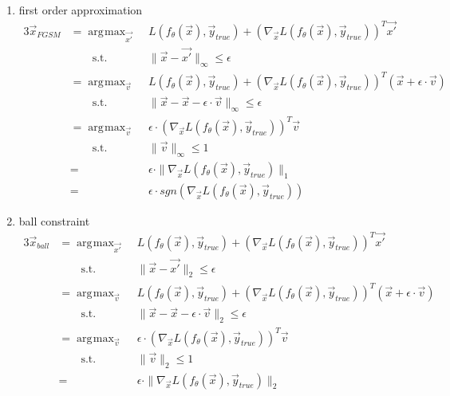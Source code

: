 \documentclass{amsart}
\DeclareMathOperator*{\argmax}{arg\!\max}
\begin{document}
\begin{enumerate}[label=(\alph*)]

\item first order approximation
\begin{alignat*}{3}
    \vec{x}_{FGSM} &= \argmax_{\vec{x'}} & \quad & L(f_{\theta}(\vec{x}), \vec{y}_{true}) + (\nabla_{\vec{x}} L(f_{\theta}(\vec{x}), \vec{y}_{true}))^T \vec{x'} \\
                   & \qquad \textrm{s.t.} & \quad & \| \vec{x} - \vec{x'} \|_{\infty} \le \epsilon \\
                   &= \argmax_{\vec{v}} & \quad & L(f_{\theta}(\vec{x}), \vec{y}_{true}) + (\nabla_{\vec{x}} L(f_{\theta}(\vec{x}), \vec{y}_{true}))^T (\vec{x} + \epsilon \cdot \vec{v}) \\
                   & \qquad \textrm{s.t.} & \quad & \| \vec{x} - \vec{x} - \epsilon \cdot \vec{v} \|_{\infty} \le \epsilon \\
                   &= \argmax_{\vec{v}} & \quad & \epsilon \cdot (\nabla_{\vec{x}} L(f_{\theta}(\vec{x}), \vec{y}_{true}))^T \vec{v} \\
                   & \qquad \textrm{s.t.} & \quad & \| \vec{v} \|_{\infty} \le 1 \\ 
                   &= & & \epsilon \cdot \| \nabla_{\vec{x}} L(f_{\theta}(\vec{x}), \vec{y}_{true}) \|_{1} \\
                   &= & & \epsilon \cdot  sgn(\nabla_{\vec{x}} L(f_{\theta}(\vec{x}), \vec{y}_{true}))
\end{alignat*}

\item ball constraint
\begin{alignat*}{3}
    \vec{x}_{ball} &= \argmax_{\vec{x'}} & \quad & L(f_{\theta}(\vec{x}), \vec{y}_{true}) + (\nabla_{\vec{x}} L(f_{\theta}(\vec{x}), \vec{y}_{true}))^T \vec{x'} \\
                   & \qquad \textrm{s.t.} & \quad & \| \vec{x} - \vec{x'} \|_{2} \le \epsilon \\
                   &= \argmax_{\vec{v}} & \quad & L(f_{\theta}(\vec{x}), \vec{y}_{true}) + (\nabla_{\vec{x}} L(f_{\theta}(\vec{x}), \vec{y}_{true}))^T (\vec{x} + \epsilon \cdot \vec{v}) \\
                   & \qquad \textrm{s.t.} & \quad & \| \vec{x} - \vec{x} - \epsilon \cdot \vec{v} \|_{2} \le \epsilon \\
                   &= \argmax_{\vec{v}} & \quad & \epsilon \cdot (\nabla_{\vec{x}} L(f_{\theta}(\vec{x}), \vec{y}_{true}))^T \vec{v} \\
                   & \qquad \textrm{s.t.} & \quad & \| \vec{v} \|_{2} \le 1 \\ 
                   &= & & \epsilon \cdot \| \nabla_{\vec{x}} L(f_{\theta}(\vec{x}), \vec{y}_{true}) \|_{2} \\
\end{alignat*}


    
\end{enumerate}
\end{document}
